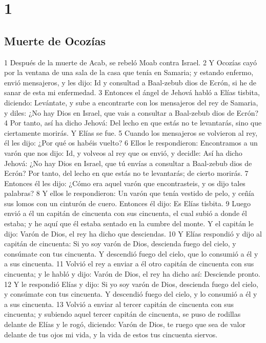 
\chapter{1}

\section*{Muerte de Ocozías}

1 Después de la muerte de Acab, se rebeló Moab contra Israel.
2 Y Ocozías cayó por la ventana de una sala de la casa que tenía en Samaria; y estando enfermo, envió mensajeros, y les dijo: Id y consultad a Baal-zebub dios de Ecrón, si he de sanar de esta mi enfermedad.
3 Entonces el ángel de Jehová habló a Elías tisbita, diciendo: Levántate, y sube a encontrarte con los mensajeros del rey de Samaria, y diles: ¿No hay Dios en Israel, que vais a consultar a Baal-zebub dios de Ecrón?
4 Por tanto, así ha dicho Jehová: Del lecho en que estás no te levantarás, sino que ciertamente morirás. Y Elías se fue.
5 Cuando los mensajeros se volvieron al rey, él les dijo: ¿Por qué os habéis vuelto?
6 Ellos le respondieron: Encontramos a un varón que nos dijo: Id, y volveos al rey que os envió, y decidle: Así ha dicho Jehová: ¿No hay Dios en Israel, que tú envías a consultar a Baal-zebub dios de Ecrón? Por tanto, del lecho en que estás no te levantarás; de cierto morirás.
7 Entonces él les dijo: ¿Cómo era aquel varón que encontrasteis, y os dijo tales palabras?
8 Y ellos le respondieron: Un varón que tenía vestido de pelo, y ceñía sus lomos con un cinturón de cuero. Entonces él dijo: Es Elías tisbita.
9 Luego envió a él un capitán de cincuenta con sus cincuenta, el cual subió a donde él estaba; y he aquí que él estaba sentado en la cumbre del monte. Y el capitán le dijo: Varón de Dios, el rey ha dicho que desciendas.
10 Y Elías respondió y dijo al capitán de cincuenta: Si yo soy varón de Dios, descienda fuego del cielo, y consúmate con tus cincuenta. Y descendió fuego del cielo, que lo consumió a él y a sus cincuenta.
11 Volvió el rey a enviar a él otro capitán de cincuenta con sus cincuenta; y le habló y dijo: Varón de Dios, el rey ha dicho así: Desciende pronto.
12 Y le respondió Elías y dijo: Si yo soy varón de Dios, descienda fuego del cielo, y consúmate con tus cincuenta. Y descendió fuego del cielo, y lo consumió a él y a sus cincuenta.
13 Volvió a enviar al tercer capitán de cincuenta con sus cincuenta; y subiendo aquel tercer capitán de cincuenta, se puso de rodillas delante de Elías y le rogó, diciendo: Varón de Dios, te ruego que sea de valor delante de tus ojos mi vida, y la vida de estos tus cincuenta siervos.
